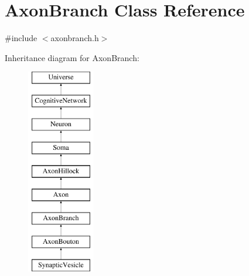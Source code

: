 \hypertarget{classAxonBranch}{}\section{Axon\+Branch Class Reference}
\label{classAxonBranch}


{\ttfamily \#include $<$axonbranch.\+h$>$}

Inheritance diagram for Axon\+Branch\+:\begin{figure}[H]
\begin{center}
\leavevmode
\includegraphics[height=9.000000cm]{classAxonBranch}
\end{center}
\end{figure}
